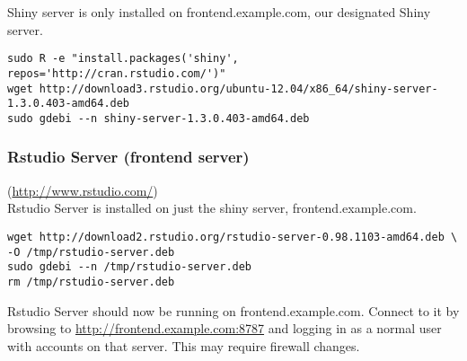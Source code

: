 Shiny server is only installed on frontend.example.com, our designated Shiny server.

\begin{verbatim}
sudo R -e "install.packages('shiny', repos='http://cran.rstudio.com/')"
wget http://download3.rstudio.org/ubuntu-12.04/x86_64/shiny-server-1.3.0.403-amd64.deb
sudo gdebi --n shiny-server-1.3.0.403-amd64.deb
\end{verbatim}

\subsubsection{Rstudio Server (frontend server)}(\url{http://www.rstudio.com/})\\
Rstudio Server is installed on just the shiny server, frontend.example.com.
\begin{verbatim}
wget http://download2.rstudio.org/rstudio-server-0.98.1103-amd64.deb \
-O /tmp/rstudio-server.deb
sudo gdebi --n /tmp/rstudio-server.deb
rm /tmp/rstudio-server.deb
\end{verbatim}

Rstudio Server should now be running on frontend.example.com.  Connect to
it by browsing to \url{http://frontend.example.com:8787} and logging in as a
normal user with accounts on that server.  This may require firewall changes.
